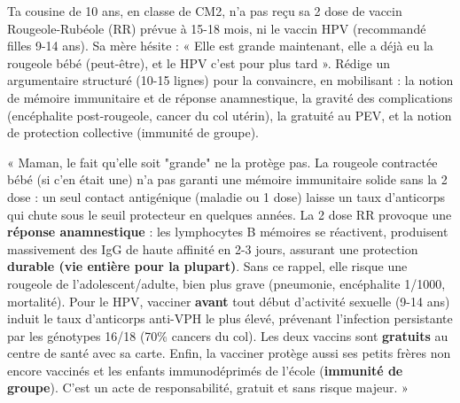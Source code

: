 \documentclass[11pt]{article}
\newcommand{\cle}[1]{{\popxbold\color{popdark}#1}}
\begin{document}
\begin{exercice}
Ta cousine de 10 ans, en classe de CM2, n'a pas reçu sa 2 dose de vaccin Rougeole-Rubéole (RR) prévue à 15-18 mois, ni le vaccin HPV (recommandé filles 9-14 ans). Sa mère hésite : « Elle est grande maintenant, elle a déjà eu la rougeole bébé (peut-être), et le HPV c'est pour plus tard ». Rédige un argumentaire structuré (10-15 lignes) pour la convaincre, en mobilisant : la notion de \cle{mémoire immunitaire} et de \cle{réponse anamnestique}, la gravité des complications (encéphalite post-rougeole, cancer du col utérin), la \cle{gratuité} au PEV, et la notion de \cle{protection collective} (immunité de groupe).
\end{exercice}

\begin{corrige}
« Maman, le fait qu'elle soit "grande" ne la protège pas. La rougeole contractée bébé (si c'en était une) n'a pas garanti une mémoire immunitaire solide sans la 2 dose : un seul contact antigénique (maladie ou 1 dose) laisse un taux d'anticorps qui chute sous le seuil protecteur en quelques années. La 2 dose RR provoque une \textbf{réponse anamnestique} : les lymphocytes B mémoires se réactivent, produisent massivement des IgG de haute affinité en 2-3 jours, assurant une protection \textbf{durable (vie entière pour la plupart)}. Sans ce rappel, elle risque une rougeole de l'adolescent/adulte, bien plus grave (pneumonie, encéphalite 1/1000, mortalité). Pour le HPV, vacciner \textbf{avant} tout début d'activité sexuelle (9-14 ans) induit le taux d'anticorps anti-VPH le plus élevé, prévenant l'infection persistante par les génotypes 16/18 (70\% cancers du col). Les deux vaccins sont \textbf{gratuits} au centre de santé avec sa carte. Enfin, la vacciner protège aussi ses petits frères non encore vaccinés et les enfants immunodéprimés de l'école (\textbf{immunité de groupe}). C'est un acte de responsabilité, gratuit et sans risque majeur. »
\end{corrige}
\end{document}
